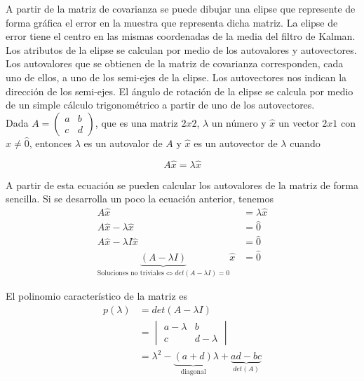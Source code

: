 A partir de la matriz de covarianza se puede dibujar una elipse que represente de forma gráfica el error en la muestra que representa dicha matriz. La elipse de error tiene el centro en las mismas coordenadas de la media del filtro de Kalman. Los atributos de la elipse se calculan por medio de los autovalores y autovectores. Los autovalores que se obtienen de la matriz de covarianza corresponden, cada uno de ellos, a uno de los semi-ejes de la elipse. Los autovectores nos indican la dirección de los semi-ejes. El ángulo de rotación de la elipse se calcula por medio de un simple cálculo trigonométrico a partir de uno de los autovectores. \\

Dada $A = \begin{pmatrix} a & b \\ c & d \end{pmatrix}$, que es una matriz $2x2$, $\lambda$ un número y $\hat{x}$ un vector $2x1$ con $\hat{x} \neq \hat{0}$, entonces $\lambda$ es un autovalor de $A$ y $\hat{x}$ es un autovector de $\lambda$ cuando

\begin{equation}
  A \hat{x} = \lambda \hat{x}
  \label{eq:eigenvalues}
\end{equation}

A partir de esta ecuación se pueden calcular los autovalores de la matriz de forma sencilla. Si se desarrolla un poco la ecuación anterior, tenemos
\begin{equation}
  \begin{split}
    A \hat{x} & = \lambda \hat{x} \\
    A \hat{x} - \lambda \hat{x} & = \hat{0} \\
    A \hat{x} - \lambda I \hat{x} & = \hat{0} \\
    \underbrace{( A - \lambda I )}_{\text{Soluciones no triviales} \iff det(A - \lambda I) = 0} \hat{x} & = \hat{0} 
  \end{split}
\end{equation}

El polinomio característico de la matriz es
\begin{equation}
\begin{split}
  p(\lambda) & = det(A - \lambda I) \\
             & = \begin{vmatrix} a - \lambda & b \\ c & d - \lambda \end{vmatrix} \\
             & = \lambda^2 - \underbrace{(a + d)}_{\text{diagonal}} \lambda + \underbrace{ad - bc}_{det(A)}
\end{split}
\end{equation}

